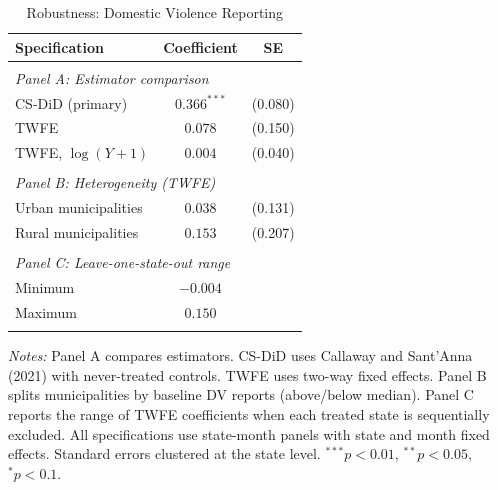 \begin{table}[!t]
\centering
\caption{Robustness: Domestic Violence Reporting}
\label{tab:robust}
\begin{threeparttable}
\begin{tabular}{lcc}
\hline\hline
Specification & Coefficient & SE \\
\hline
\\[-1.8ex]
\multicolumn{3}{l}{\textit{Panel A: Estimator comparison}} \\
CS-DiD (primary) & $0.366^{***}$ & (0.080) \\
TWFE & $0.078$ & (0.150) \\
TWFE, $\log(Y+1)$ & $0.004$ & (0.040) \\
\\[-1.8ex]
\multicolumn{3}{l}{\textit{Panel B: Heterogeneity (TWFE)}} \\
Urban municipalities & $0.038$ & (0.131) \\
Rural municipalities & $0.153$ & (0.207) \\
\\[-1.8ex]
\multicolumn{3}{l}{\textit{Panel C: Leave-one-state-out range}} \\
Minimum & $-0.004$ & \\
Maximum & $0.150$ & \\
\\[-1.8ex]
\hline\hline
\end{tabular}
\begin{tablenotes}
\item \textit{Notes:} Panel A compares estimators. CS-DiD uses Callaway and Sant'Anna (2021) with never-treated controls. TWFE uses two-way fixed effects. Panel B splits municipalities by baseline DV reports (above/below median). Panel C reports the range of TWFE coefficients when each treated state is sequentially excluded. All specifications use state-month panels with state and month fixed effects. Standard errors clustered at the state level. $^{***}p<0.01$, $^{**}p<0.05$, $^{*}p<0.1$.
\end{tablenotes}
\end{threeparttable}
\end{table}

